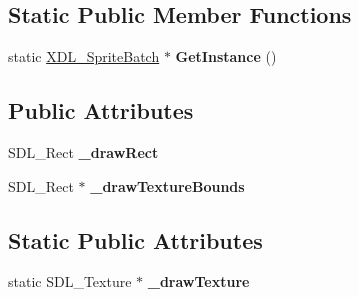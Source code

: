 \subsection*{Static Public Member Functions}
\begin{DoxyCompactItemize}
\item 
\hypertarget{class_x_d_l___sprite_batch_a1a5318ca5a0a82603f96453793afa6d0}{static \hyperlink{class_x_d_l___sprite_batch}{X\-D\-L\-\_\-\-Sprite\-Batch} $\ast$ {\bfseries Get\-Instance} ()}\label{class_x_d_l___sprite_batch_a1a5318ca5a0a82603f96453793afa6d0}

\end{DoxyCompactItemize}
\subsection*{Public Attributes}
\begin{DoxyCompactItemize}
\item 
\hypertarget{class_x_d_l___sprite_batch_afcee76b702fbc3794783ab86c73cf8d0}{S\-D\-L\-\_\-\-Rect {\bfseries \-\_\-draw\-Rect}}\label{class_x_d_l___sprite_batch_afcee76b702fbc3794783ab86c73cf8d0}

\item 
\hypertarget{class_x_d_l___sprite_batch_a8ce0db8774bbedf72939f071ac02f100}{S\-D\-L\-\_\-\-Rect $\ast$ {\bfseries \-\_\-draw\-Texture\-Bounds}}\label{class_x_d_l___sprite_batch_a8ce0db8774bbedf72939f071ac02f100}

\end{DoxyCompactItemize}
\subsection*{Static Public Attributes}
\begin{DoxyCompactItemize}
\item 
\hypertarget{class_x_d_l___sprite_batch_a37476782380898a316c9bb7a09aeee0d}{static S\-D\-L\-\_\-\-Texture $\ast$ {\bfseries \-\_\-draw\-Texture}}\label{class_x_d_l___sprite_batch_a37476782380898a316c9bb7a09aeee0d}

\end{DoxyCompactItemize}


